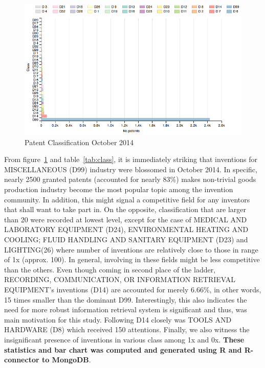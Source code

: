 \documentclass{article}
\begin{document}
\begin{figure}[H]
\centering
\includegraphics[width=\textwidth]{rplot-classification.png}
\caption{ Patent Classification October 2014 }\label{fig:rplot}
\end{figure}

From figure~\ref{fig:rplot} and table~\ref{tab:class}, it is immediately striking that inventions for MISCELLANEOUS (D99) industry were blossomed in October 2014. In specific, nearly 2500 granted patents (accounted for nearly 83\%) makes non-trivial goods production industry become the most popular topic among the invention community. In addition, this might signal a competitive field for any inventors that shall want to take part in. On the opposite, classification that are larger than 20 were recorded at lowest level, except for the case of  MEDICAL AND LABORATORY EQUIPMENT (D24), ENVIRONMENTAL HEATING AND COOLING; FLUID HANDLING AND SANITARY EQUIPMENT (D23) and LIGHTING(26) where number of inventions are relatively close to those in range of 1x (approx. 100). In general, involving in these fields might be less competitive than the others. Even though coming in second place of the ladder, RECORDING, COMMUNICATION, OR INFORMATION RETRIEVAL EQUIPMENT's inventions (D14) are accounted for merely 6.66\%, in other words, 15 times smaller than the dominant D99. Interestingly, this also indicates the need for more robust information retrieval system is significant and thus, was main motivation for this study. Following D14 closely was TOOLS AND HARDWARE (D8) which received 150 attentions. Finally, we  also witness the insignificant presence of inventions in various class among 1x and 0x. \textbf{These statistics and bar chart was computed and generated using R and R-connector to MongoDB}.
\end{document}
